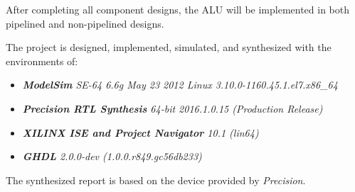 After completing all component designs, the ALU will be implemented in both pipelined and non-pipelined designs.

\noindent The project is designed, implemented, simulated, and synthesized with the environments of:
\begin{itemize}
	\item \textit{\textbf{ModelSim} SE-64 6.6g May 23 2012 Linux 3.10.0-1160.45.1.el7.x86\_64}
	\item \textit{\textbf{Precision RTL Synthesis}  64-bit 2016.1.0.15 (Production Release)}
	\item \textit{\textbf{XILINX ISE and Project Navigator}  10.1 (lin64)}
	\item \textit{\textbf{GHDL} 2.0.0-dev (1.0.0.r849.gc56db233)}
\end{itemize}

\noindent The synthesized report is based on the  device provided by \textit{Precision}.
